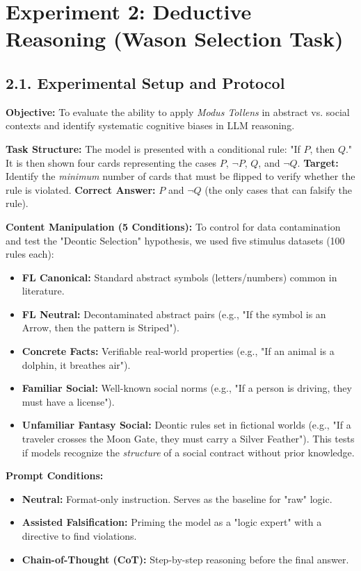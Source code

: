 \section*{Experiment 2: Deductive Reasoning (Wason Selection Task)}

\subsection*{2.1. Experimental Setup and Protocol}
\textbf{Objective:} To evaluate the ability to apply \textit{Modus Tollens} in abstract vs. social contexts and identify systematic cognitive biases in LLM reasoning.

\textbf{Task Structure:}
The model is presented with a conditional rule: "If $P$, then $Q$." It is then shown four cards representing the cases $P$, $\neg P$, $Q$, and $\neg Q$. 
\textbf{Target:} Identify the \textit{minimum} number of cards that must be flipped to verify whether the rule is violated.
\textbf{Correct Answer:} $P$ and $\neg Q$ (the only cases that can falsify the rule).

\textbf{Content Manipulation (5 Conditions):}
To control for data contamination and test the "Deontic Selection" hypothesis, we used five stimulus datasets (100 rules each):
\begin{itemize}
    \item \textbf{FL Canonical:} Standard abstract symbols (letters/numbers) common in literature.
    \item \textbf{FL Neutral:} Decontaminated abstract pairs (e.g., "If the symbol is an Arrow, then the pattern is Striped").
    \item \textbf{Concrete Facts:} Verifiable real-world properties (e.g., "If an animal is a dolphin, it breathes air").
    \item \textbf{Familiar Social:} Well-known social norms (e.g., "If a person is driving, they must have a license").
    \item \textbf{Unfamiliar Fantasy Social:} Deontic rules set in fictional worlds (e.g., "If a traveler crosses the Moon Gate, they must carry a Silver Feather"). This tests if models recognize the \textit{structure} of a social contract without prior knowledge.
\end{itemize}

\textbf{Prompt Conditions:}
\begin{itemize}
    \item \textbf{Neutral:} Format-only instruction. Serves as the baseline for "raw" logic.
    \item \textbf{Assisted Falsification:} Priming the model as a "logic expert" with a directive to find violations.
    \item \textbf{Chain-of-Thought (CoT):} Step-by-step reasoning before the final answer.
\end{itemize}

